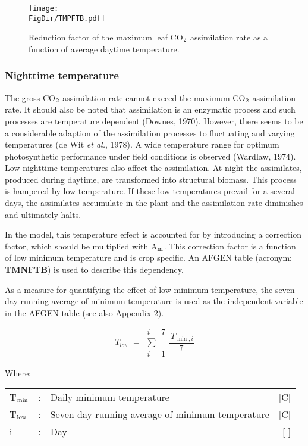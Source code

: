 \begin{figure}[p]
	\centering
	\texttt{[image: \\FigDir/TMPFTB.pdf]}
	\caption{Reduction factor of the maximum leaf CO$_{{\rm 2}}$ assimilation rate as a function of
		average daytime temperature.}
	\label{fig:TMPFTB}
\end{figure}

\subsubsection{Nighttime temperature}
The gross CO$_{{\rm 2}}$ assimilation rate cannot exceed the maximum CO$_{{\rm 2}}$ assimilation rate. It
should also be noted that assimilation is an enzymatic process and such processes are
temperature dependent (Downes, 1970). However, there seems to be a considerable
adaption of the assimilation processes to fluctuating and varying temperatures (de Wit {\it et
	al.}, 1978). A wide temperature range for optimum photosynthetic performance under field
conditions is observed (Wardlaw, 1974). Low nighttime temperatures also affect the
assimilation. At night the assimilates, produced during daytime, are transformed into
structural biomass. This process is hampered by low temperature. If these low temperatures prevail 
for a several days, the assimilates accumulate in the plant and the assimilation rate diminishes 
and ultimately halts.

In the model, this temperature effect is accounted for by introducing a correction factor,
which should be multiplied with A$_{{\rm m}}$. This correction factor is a function of low minimum
temperature and is crop specific. An AFGEN table (acronym: {\bf TMNFTB}) is used to
describe this dependency.

As a measure for quantifying the effect of low minimum temperature, the seven day
running average of minimum temperature is used as the independent variable in the
AFGEN table (see also Appendix 2).

\begin{equation}
T _{low} ~=~\begin{array}{c}{i=7}  \\
\sum  \\
{i=1}\end{array}{\frac{\, T _{\min ,i} }{7}}
\end{equation}

Where:\\[5pt]
\begin{tabularx}{\textwidth}{llXr}
	T$_{{\rm min}}$  &:& Daily minimum temperature   &     [\degrees C]\\
	T$_{{\rm low}}$ &:& Seven day running average of minimum temperature    &    [\degrees C]\\
	i &:& Day    &    [-]
\end{tabularx}


